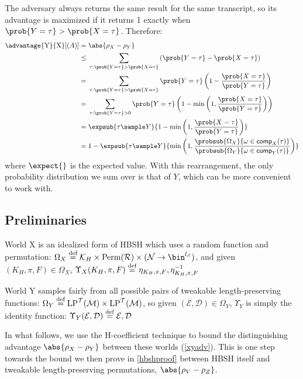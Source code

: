 \documentclass[eprint.tex]{subfiles}
\begin{document}
The adversary always returns the same result for the same transcript, so
its advantage is maximized if it returns 1 exactly when $\prob{Y = \tau} > \prob{X = \tau}$.
Therefore:
\begin{align*}
    \advantage{\textrm{Y}}{\textrm{X}}[(A)] ={}&
    \abs{\rho_X - \rho_Y} \\
    \leq {}& \sum_{\tau: \prob{Y = \tau} > \prob{X = \tau}}
    \left(\prob{Y = \tau} - \prob{X = \tau}\right) \\
    = {}& \sum_{\tau: \prob{Y = \tau} > \prob{X = \tau}}
    \prob{Y = \tau}\left(1 - \frac{\prob{X = \tau}}{\prob{Y = \tau}}\right) \\
    = {}& \sum_{\tau: \prob{Y = \tau} > 0}
    \prob{Y = \tau}\left(1 - \minone{\frac{\prob{X = \tau}}{\prob{Y = \tau}}}\right) \\
    = {}& \expsub{\tau \sample Y}{1 - \minone{
           \frac{\prob{X = \tau}}{\prob{Y = \tau}}
        }} \\
    = {}& 1 - \expsub{\tau \sample Y}{\minone{
           \frac{\probsub{\Omega_X}{\omega \in \comp_X(\tau)}}
           {\probsub{\Omega_Y}{\omega \in \comp_Y(\tau)}}
        }}
\end{align*}
where $\expect{}$ is the expected value.
With this rearrangement, the only probability distribution we sum over is that
of $Y$, which can be more convenient to work with.

\subsection{Preliminaries}
World X is
an idealized form of HBSH which uses a random function and permutation:
$\Omega_X \defeq \mathcal{K}_H \times \Perm(\mathcal{R}) \times (\mathcal{N} \rightarrow \bin^{l_S})$,
and given $(K_H, \pi, F) \in \Omega_X$,
$\Upsilon_X(K_H, \pi, F) \stackrel{\text{def}}{=} \eta_{K_H, \pi, F}, \eta_{K_H, \pi, F}^{-1}$

World Y samples fairly from all possible pairs of tweakable length-preserving functions:
$\Omega_Y \stackrel{\text{def}}{=} \operatorname{LP}^\mathcal{T}(\mathcal{M}) \times \operatorname{LP}^\mathcal{T}(\mathcal{M})$,
so given $(\mathcal{E}, \mathcal{D}) \in \Omega_Y$, $\Upsilon_Y$ is simply the identity function:
$\Upsilon_Y(\mathcal{E}, \mathcal{D}) \stackrel{\text{def}}{=} \mathcal{E}, \mathcal{D}$

In what follows, we use the H-coefficient technique to bound the distinguishing advantage
$\abs{\rho_X - \rho_Y}$
between these worlds (\autoref{xyadv}). This is one step towards the bound we then prove in
\autoref{hbshproof} between HBSH itself and tweakable length-preserving permutations,
$\abs{\rho_V - \rho_Z}$.
\end{document}
